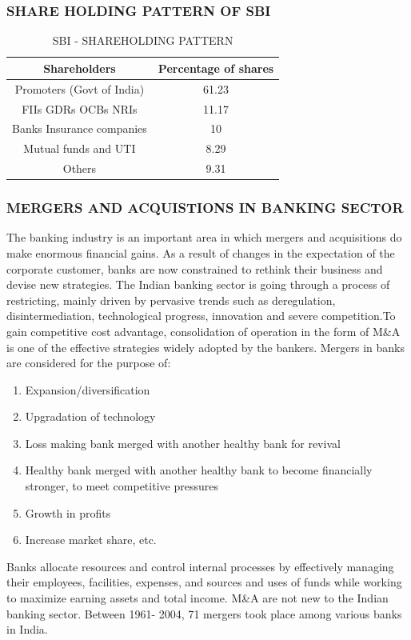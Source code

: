 \documentclass[a4paper, 12pt]{extarticle}
\begin{document}
{\subsubsection{SHARE HOLDING PATTERN OF SBI}
\begin{table}[H]
\centering
\begin{tabular}{|c|c|}
\hline
Shareholders & Percentage of shares \\
\hline
Promoters (Govt of India) & 61.23 \\
\hline
FIIs GDRs OCBs NRIs & 11.17 \\
\hline
Banks Insurance companies & 10\\
\hline
Mutual funds and UTI & 8.29\\
\hline
Others & 9.31 \\
\hline
\end{tabular}
\caption{SBI - SHAREHOLDING PATTERN}
\end{table}

\subsubsection{MERGERS AND ACQUISTIONS IN BANKING SECTOR}
The banking industry is an important area in which mergers and acquisitions do make enormous financial gains. As a result of changes in the expectation of the corporate customer, banks are now constrained to rethink their business and devise new strategies. The Indian banking sector is going through a process of restricting, mainly driven by pervasive trends such as deregulation, disintermediation, technological progress, innovation and severe competition.To gain competitive cost advantage, consolidation of operation in the form of M\&A is one of the effective strategies widely adopted by the bankers. Mergers in banks are considered for the purpose of:
\begin{enumerate}
\item Expansion/diversification
\item Upgradation of technology
\item Loss making bank merged with another healthy bank for revival
\item Healthy bank merged with another healthy bank to become financially
stronger, to meet competitive pressures
\item Growth in profits
\item Increase market share, etc.
\end{enumerate}
Banks allocate resources and control internal processes by effectively
managing their employees, facilities, expenses, and sources and uses of funds while working to maximize earning assets and total income. M\&A are not new to the Indian banking sector. Between 1961- 2004, 71 mergers took place among various banks in India.
}
\end{document}
